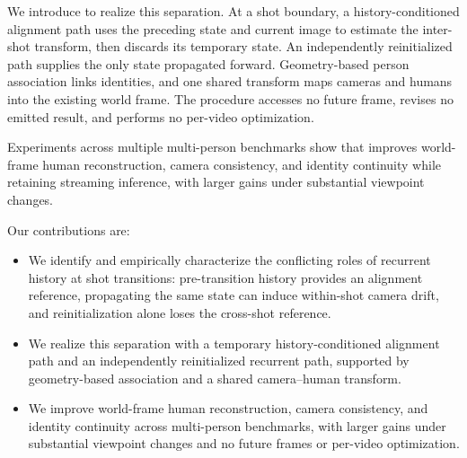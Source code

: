 We introduce \method{} to realize this separation. At a shot boundary, a
history-conditioned alignment path uses the preceding state and current image
to estimate the inter-shot transform, then discards its temporary state. An
independently reinitialized path supplies the only state propagated forward.
Geometry-based person association links identities, and one shared transform
maps cameras and humans into the existing world frame. The procedure accesses
no future frame, revises no emitted result, and performs no per-video
optimization.

Experiments across multiple multi-person benchmarks show that \method{}
improves world-frame human reconstruction, camera consistency, and identity
continuity while retaining streaming inference, with larger gains under
substantial viewpoint changes.

Our contributions are:
\begin{itemize}
  \item We identify and empirically characterize the conflicting roles of
  recurrent history at shot transitions: pre-transition history provides an
  alignment reference, propagating the same state can induce within-shot
  camera drift, and reinitialization alone loses the cross-shot reference.

  \item We realize this separation with a temporary history-conditioned
  alignment path and an independently reinitialized recurrent path, supported
  by geometry-based association and a shared camera--human transform.

  \item We improve world-frame human reconstruction, camera consistency, and
  identity continuity across multi-person benchmarks, with larger gains under
  substantial viewpoint changes and no future frames or per-video optimization.
\end{itemize}
